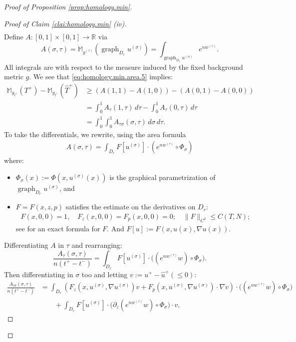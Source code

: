 \documentclass[11pt, letterpaper, reqno]{amsart}
\numberwithin{equation}{section}
\theoremstyle{remark}
\newcommand{\MM}{\mathbb{M}}
\newcommand{\RR}{\mathbb{R}}
\newcommand{\graph}{\operatorname{graph}}
\begin{document}
\begin{proof}[Proof of Proposition \ref{prop:homology.min}]
\begin{proof}[Proof of Claim \ref{clai:homology.min} (iv)]
\begin{align*}
        \end{align*}
		  Define $A : [0,1] \times [0,1] \to \RR$ via
		\[ A(\sigma, \tau) = \MM_{g^{(\tau)}}(\graph_{D_r} u^{(\sigma)}) = \int_{\graph_{D_r} u^{(\sigma)}} e^{nw^{(\tau)}}. \]
		All integrals are with respect to the measure induced by the fixed background metric $g$. We see that \eqref{eq:homology.min.area.5} implies:
		\begin{align} \label{eq:homology.min.area.6}
			\MM_{g_{t^+}}(T^+) - \MM_{g_{t^+}}(\hat T^+)
				& \geq (A(1,1) - A(1,0)) - (A(0,1) - A(0,0)) \nonumber \\
				& = \int_0^1 A_\tau(1,\tau) \, d\tau - \int_0^1 A_\tau(0,\tau) \, d\tau \nonumber \\
				& = \int_0^1 \int_0^1 A_{\tau \sigma}(\sigma, \tau) \, d\sigma \, d\tau.
		\end{align}
        To take the differentials, we rewrite, using the area formula
        \begin{align*}
            A(\sigma, \tau) = \int_{D_r} F[u^{(\sigma)}]\cdot (e^{nw^{(\tau)}}\circ\Phi_\sigma)
        \end{align*}
        where:
        \begin{itemize}
        	\item $\Phi_\sigma(x):= \Phi(x, u^{(\sigma)}(x))$ is the graphical parametrization of $\graph_{D_r} u^{(\sigma)}$, and 
			\item $F=F(x, z, p)$ satisfies the estimate on the derivatives on $D_r$:
	        \begin{align}
            F(x, 0 ,0) = 1, \quad 
            F_z(x, 0, 0) = F_p(x, 0, 0) = 0; \quad
            \|F\|_{C^2}\leq C(T, N); \label{eq:AreaIntegrandEst}
	        \end{align}
                see \cite[(A.12)]{ChodoshMantoulidis:ac.3d} for an exact formula for $F$. And $F[u]:= F(x, u(x), \nabla u(x))$.
	    \end{itemize}
        Differentiating $A$ in $\tau$ and rearranging:
		\[ \frac{A_\tau(\sigma, \tau)}{n(t^+-t^-)} = \int_{D_r} F[u^{(\sigma)}]\cdot \big( (e^{n w^{(\tau)}}w) \circ\Phi_\sigma \big). \]
		Then differentiating in $\sigma$ too and letting $v:= u^+ - \hat u^+(\leq 0)$:
		\begin{align*}
			\frac{A_{\tau \sigma}(\sigma, \tau)}{n(t^+-t^-)} 
			& = \int_{D_r} \left(F_z(x, u^{(\sigma)}, \nabla u^{(\sigma)})v + F_p(x, u^{(\sigma)}, \nabla u^{(\sigma)})\cdot \nabla v\right)\cdot \big( (e^{n w^{(\tau)}}w)\circ\Phi_\sigma \big) \\
            & \qquad + \int_{D_r} F[u^{(\sigma)}]\cdot \big(\partial_z(e^{n w^{(\tau)}}w)\circ\Phi_\sigma \big) \cdot v ,
		\end{align*}


\end{proof}
\end{proof}
\end{document}
